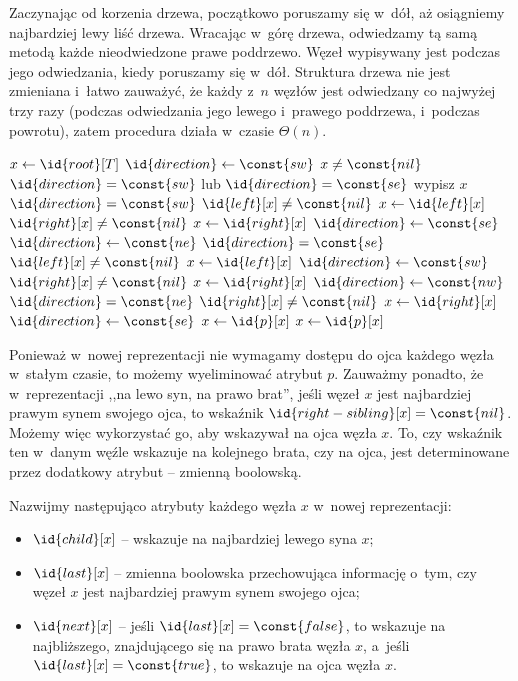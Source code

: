 Zaczynając od korzenia drzewa, początkowo poruszamy się w~dół, aż osiągniemy najbardziej lewy liść drzewa. Wracając w~górę drzewa, odwiedzamy tą samą metodą każde nieodwiedzone prawe poddrzewo. Węzeł wypisywany jest podczas jego odwiedzania, kiedy poruszamy się w~dół. Struktura drzewa nie jest zmieniana i~łatwo zauważyć, że każdy z~$n$ węzłów jest odwiedzany co najwyżej trzy razy (podczas odwiedzania jego lewego i~prawego poddrzewa, i~podczas powrotu), zatem procedura działa w~czasie $\Theta(n)$.
\begin{codebox}
\li	$x\gets\id{root}[T]$
\li	$\id{direction}\gets\const{sw}$
\li	\While $x\ne\const{nil}$
\li		\Do
			\If $\id{direction}=\const{sw}$ lub $\id{direction}=\const{se}$
\li				\Then wypisz $x$
				\End
\li			\If $\id{direction}=\const{sw}$
\li				\Then
					\If $\id{left}[x]\ne\const{nil}$
\li						\Then $x\gets\id{left}[x]$
\li					\ElseIf $\id{right}[x]\ne\const{nil}$
\li						\Then
							$x\gets\id{right}[x]$
\li							$\id{direction}\gets\const{se}$
\li					\ElseNoIf $\id{direction}\gets\const{ne}$
						\End
\li			\ElseIf $\id{direction}=\const{se}$
\li				\Then
					\If $\id{left}[x]\ne\const{nil}$
\li						\Then
							$x\gets\id{left}[x]$
\li							$\id{direction}\gets\const{sw}$
\li					\ElseIf $\id{right}[x]\ne\const{nil}$
\li						\Then $x\gets\id{right}[x]$
\li					\ElseNoIf $\id{direction}\gets\const{nw}$
						\End
\li			\ElseIf $\id{direction}=\const{ne}$
\li				\Then
					\If $\id{right}[x]\ne\const{nil}$
\li						\Then
							$x\gets\id{right}[x]$
\li							$\id{direction}\gets\const{se}$
\li						\Else $x\gets\id{p}[x]$
						\End
\li			\ElseNoIf $x\gets\id{p}[x]$
				\End
		\End
\end{codebox}

\exercise %
Ponieważ w~nowej reprezentacji nie wymagamy dostępu do ojca każdego węzła w~stałym czasie, to możemy wyeliminować atrybut $p$. Zauważmy ponadto, że w~reprezentacji ,,na lewo syn, na prawo brat'', jeśli węzeł $x$ jest najbardziej prawym synem swojego ojca, to wskaźnik $\id{right-sibling}[x]=\const{nil}$. Możemy więc wykorzystać go, aby wskazywał na ojca węzła $x$. To, czy wskaźnik ten w~danym węźle wskazuje na kolejnego brata, czy na ojca, jest determinowane przez dodatkowy atrybut -- zmienną boolowską.

Nazwijmy następująco atrybuty każdego węzła $x$ w~nowej reprezentacji:
\begin{itemize}
	\item $\id{child}[x]$ -- wskazuje na najbardziej lewego syna $x$;
    \item $\id{last}[x]$ -- zmienna boolowska przechowująca informację o~tym, czy węzeł $x$ jest najbardziej prawym synem swojego ojca;
	\item $\id{next}[x]$ -- jeśli $\id{last}[x]=\const{false}$, to wskazuje na najbliższego, znajdującego się na prawo brata węzła $x$, a~jeśli $\id{last}[x]=\const{true}$, to wskazuje na ojca węzła $x$.
\end{itemize}

